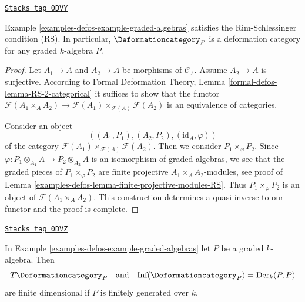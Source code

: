 \begin{lemma}
\label{examples-defos-lemma-graded-algebras-RS}
\href{https://stacks.math.columbia.edu/tag/0DVY}{\texttt{Stacks tag 0DVY}}

Example \ref{examples-defos-example-graded-algebras}
satisfies the Rim-Schlessinger condition (RS).
In particular, $\Deformationcategory_P$ is a deformation category
for any graded $k$-algebra $P$.
\end{lemma}

\begin{proof}
Let $A_1 \to A$ and $A_2 \to A$ be morphisms of $\mathcal{C}_\Lambda$.
Assume $A_2 \to A$ is surjective. According to
Formal Deformation Theory, Lemma
\ref{formal-defos-lemma-RS-2-categorical}
it suffices to show that the functor
$\mathcal{F}(A_1 \times_A A_2) \to
\mathcal{F}(A_1) \times_{\mathcal{F}(A)} \mathcal{F}(A_2)$
is an equivalence of categories.

\medskip\noindent
Consider an object
$$
((A_1, P_1), (A_2, P_2), (\text{id}_A, \varphi))
$$
of the category $\mathcal{F}(A_1) \times_{\mathcal{F}(A)} \mathcal{F}(A_2)$.
Then we consider $P_1 \times_\varphi P_2$. Since
$\varphi : P_1 \otimes_{A_1} A \to P_2 \otimes_{A_2} A$
is an isomorphism of graded algebras, we see that the graded pieces
of $P_1 \times_\varphi P_2$ are finite projective $A_1 \times_A A_2$-modules,
see proof of Lemma \ref{examples-defos-lemma-finite-projective-modules-RS}.
Thus $P_1 \times_\varphi P_2$ is an object of $\mathcal{F}(A_1 \times_A A_2)$.
This construction determines a quasi-inverse to our functor
and the proof is complete.
\end{proof}

\begin{lemma}
\label{examples-defos-lemma-graded-algebras-TI}
\href{https://stacks.math.columbia.edu/tag/0DVZ}{\texttt{Stacks tag 0DVZ}}

In Example \ref{examples-defos-example-graded-algebras} let $P$ be a graded $k$-algebra.
Then
$$
T\Deformationcategory_P
\quad\text{and}\quad
\text{Inf}(\Deformationcategory_P) = \text{Der}_k(P, P)
$$
are finite dimensional if $P$ is finitely generated over $k$.
\end{lemma}

